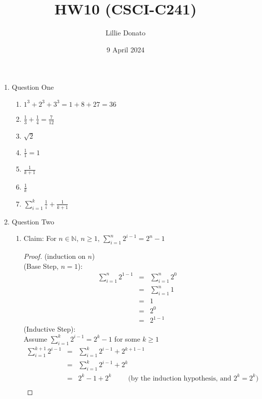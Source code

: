\documentclass{article}
\title{HW10 (CSCI-C241)}
\author{Lillie Donato}
\date{9 April 2024}
\begin{document}
\maketitle

\begin{enumerate}
    \item Question One
    \begin{enumerate}
        \item $1^3 + 2^3 + 3^3 = 1 + 8 + 27 = 36$
        \item $\frac{1}{3} + \frac{1}{4} = \frac{7}{12}$
        \item $\sqrt{2}$
        \item $\frac{1}{1} = 1$
        \item $\frac{1}{k+1}$
        \item $\frac{1}{k}$
        \item $\sum\limits_{i=1}^{k}{\frac{1}{i}} + \frac{1}{k+1}$
    \end{enumerate}
    \item Question Two
    \begin{enumerate}
        \item Claim: For $n \in \mathbb{N}$, $n \geq 1$, $\sum\limits_{i=1}^{n}{2^{i-1} = 2^n - 1}$
        \begin{proof}
            (induction on $n$) \\
            (Base Step, $n=1$):
            \begin{eqnarray}
                \sum\limits_{i=1}^{n}{2^{1-1}} &=& \sum\limits_{i=1}^{n}{2^0} \\
                &=& \sum\limits_{i=1}^{n}{1} \\
                &=& 1 \\
                &=& 2^0 \\
                &=& 2^{1-1}
            \end{eqnarray}
            (Inductive Step): \\
            Assume $\sum\limits_{i=1}^{k}{2^{i-1}} = 2^k - 1$ for some $k \geq 1$
            \begin{eqnarray}
                \sum\limits_{i=1}^{k+1}{2^{i-1}} &=& \sum\limits_{i=1}^{k}{2^{i-1}} + 2^{k+1-1} \\
                &=& \sum\limits_{i=1}^{k}{2^{i-1}} + 2^k \\
                &=& 2^k - 1 + 2^k \hspace{1cm} \text{(by the induction hypothesis, and $2^k = 2^k$)} \\

\end{eqnarray}
\end{proof}
\end{enumerate}
\end{enumerate}
\end{document}
